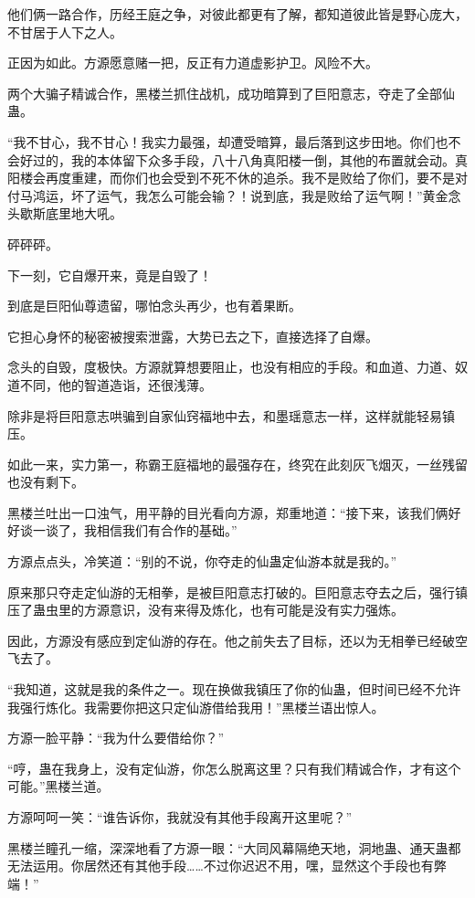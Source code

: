 \begin{this_body}
他们俩一路合作，历经王庭之争，对彼此都更有了解，都知道彼此皆是野心庞大，不甘居于人下之人。

正因为如此。方源愿意赌一把，反正有力道虚影护卫。风险不大。

两个大骗子精诚合作，黑楼兰抓住战机，成功暗算到了巨阳意志，夺走了全部仙蛊。

“我不甘心，我不甘心！我实力最强，却遭受暗算，最后落到这步田地。你们也不会好过的，我的本体留下众多手段，八十八角真阳楼一倒，其他的布置就会动。真阳楼会再度重建，而你们也会受到不死不休的追杀。我不是败给了你们，要不是对付马鸿运，坏了运气，我怎么可能会输？！说到底，我是败给了运气啊！”黄金念头歇斯底里地大吼。

砰砰砰。

下一刻，它自爆开来，竟是自毁了！

到底是巨阳仙尊遗留，哪怕念头再少，也有着果断。

它担心身怀的秘密被搜索泄露，大势已去之下，直接选择了自爆。

念头的自毁，度极快。方源就算想要阻止，也没有相应的手段。和血道、力道、奴道不同，他的智道造诣，还很浅薄。

除非是将巨阳意志哄骗到自家仙窍福地中去，和墨瑶意志一样，这样就能轻易镇压。

如此一来，实力第一，称霸王庭福地的最强存在，终究在此刻灰飞烟灭，一丝残留也没有剩下。

黑楼兰吐出一口浊气，用平静的目光看向方源，郑重地道：“接下来，该我们俩好好谈一谈了，我相信我们有合作的基础。”

方源点点头，冷笑道：“别的不说，你夺走的仙蛊定仙游本就是我的。”

原来那只夺走定仙游的无相拳，是被巨阳意志打破的。巨阳意志夺去之后，强行镇压了蛊虫里的方源意识，没有来得及炼化，也有可能是没有实力强炼。

因此，方源没有感应到定仙游的存在。他之前失去了目标，还以为无相拳已经破空飞去了。

“我知道，这就是我的条件之一。现在换做我镇压了你的仙蛊，但时间已经不允许我强行炼化。我需要你把这只定仙游借给我用！”黑楼兰语出惊人。

方源一脸平静：“我为什么要借给你？”

“哼，蛊在我身上，没有定仙游，你怎么脱离这里？只有我们精诚合作，才有这个可能。”黑楼兰道。

方源呵呵一笑：“谁告诉你，我就没有其他手段离开这里呢？”

黑楼兰瞳孔一缩，深深地看了方源一眼：“大同风幕隔绝天地，洞地蛊、通天蛊都无法运用。你居然还有其他手段……不过你迟迟不用，嘿，显然这个手段也有弊端！”


\end{this_body}
